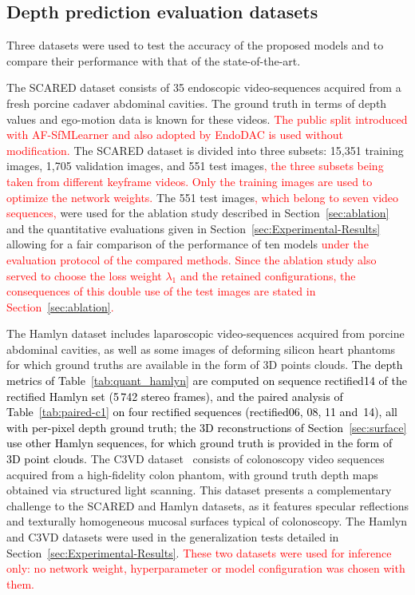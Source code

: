 \documentclass[a4paper,fleqn]{cas-dc}
\begin{document}
\subsection{Depth prediction evaluation datasets}
Three datasets were used to test the accuracy of the proposed models and to compare their performance with that of the state-of-the-art. 

The SCARED dataset consists of 35 endoscopic video-sequences acquired from a fresh porcine cadaver abdominal cavities. The ground truth in terms of depth values and ego-motion data is known for these videos. \textcolor{red}{The public split introduced with AF-SfMLearner \citep{Shao_MIA_2022} and also adopted by EndoDAC \citep{EndoDAC_MICCAI_2024} is used without modification.} The SCARED dataset is divided into three subsets: 15,351 training images, 1,705 validation images, and 551 test images\textcolor{red}{, the three subsets being taken from different keyframe videos. Only the training images are used to optimize the network weights.} The 551 test images\textcolor{red}{, which belong to seven video sequences,} were used for the ablation study described in Section~\ref{sec:ablation} and the quantitative evaluations given in Section~\ref{sec:Experimental-Results} allowing for a fair comparison of the performance of ten models \textcolor{red}{ under the evaluation protocol of the compared methods. Since the ablation study also served to choose the loss weight $\lambda_1$ and the retained configurations, the consequences of this double use of the test images are stated in Section~\ref{sec:ablation}.}


The Hamlyn dataset \citep{Recasens_IEEERAL_2021} includes laparoscopic video-sequences acquired from porcine abdominal cavities, as well as some images of deforming silicon heart phantoms for which ground truths are available in the form of 3D points clouds. \textcolor{black}{ The depth metrics of Table~\ref{tab:quant_hamlyn} are computed on sequence rectified14 of the rectified Hamlyn set (5\,742 stereo frames), and the paired analysis of Table~\ref{tab:paired-c1} on four rectified sequences (rectified06, 08, 11 and~14), all with per-pixel depth ground truth; the 3D reconstructions of Section~\ref{sec:surface} use other Hamlyn sequences, for which ground truth is provided in the form of 3D point clouds.} The C3VD dataset~\citep{bobrow2023colonoscopy} consists of colonoscopy video sequences acquired from a 
high-fidelity colon phantom, with ground truth depth maps obtained via structured light scanning. This dataset presents a complementary challenge to the SCARED and Hamlyn datasets, as it features specular reflections and texturally homogeneous mucosal surfaces typical of colonoscopy. The Hamlyn and C3VD datasets were used in the generalization tests detailed in Section~\ref{sec:Experimental-Results}. \textcolor{red}{These two datasets were used for inference only: no network weight, hyperparameter or model configuration was chosen with them.} 
\end{document}
